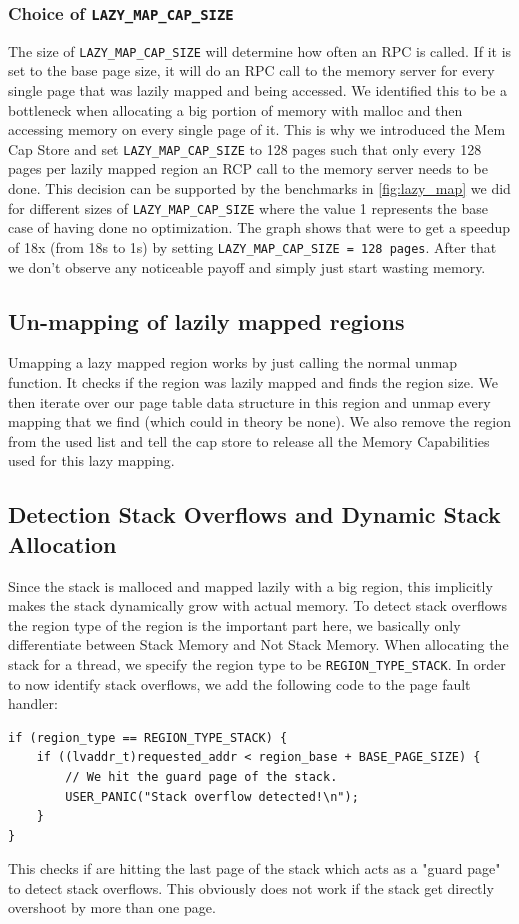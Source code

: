 \subsubsection{Choice of \texttt{LAZY_MAP_CAP_SIZE} } 
The size of  \texttt{LAZY_MAP_CAP_SIZE} will determine how often an RPC is called. 
If it is set to the base page size, it will do an RPC call to the memory server for every single page that was lazily mapped and being accessed. 
We identified this to be a bottleneck when allocating a big portion of memory with malloc and then accessing memory on every single page of it. 
This is why we introduced the Mem Cap Store and set \texttt{LAZY_MAP_CAP_SIZE} to 128 pages such that only every 128 pages per lazily mapped region an RCP call to the memory server needs to be done. 
This decision can be supported by the benchmarks in \ref{fig:lazy_map} we did for different sizes of \texttt{LAZY_MAP_CAP_SIZE} where the value 1 represents the base case of having done no optimization. 
The graph shows that were to get a speedup of 18x (from 18s to 1s) by setting \texttt{LAZY_MAP_CAP_SIZE = 128 pages}. After that we don't observe any noticeable payoff and simply just start wasting memory.




\subsection{Un-mapping of lazily mapped regions}

Umapping a lazy mapped region works by just calling the normal unmap function. 
It checks if the region was lazily mapped and finds the region size. We then iterate over our page table data structure in this region and unmap every mapping that we find (which could in theory be none). We also remove the region from the used list and tell the cap store to release all the Memory Capabilities used for this lazy mapping.

\subsection{Detection Stack Overflows and Dynamic Stack Allocation}
Since the stack is malloced and mapped lazily with a big region, this implicitly makes the stack dynamically grow with actual memory.
To detect stack overflows the region type of the region is the important part here, we basically only differentiate between Stack Memory and Not Stack Memory. When allocating the stack for a thread, we specify the region type to be \texttt{REGION_TYPE_STACK}.
In order to now identify stack overflows, we add the following code to the page fault handler:
\begin{verbatim}
if (region_type == REGION_TYPE_STACK) {
    if ((lvaddr_t)requested_addr < region_base + BASE_PAGE_SIZE) {
        // We hit the guard page of the stack.
        USER_PANIC("Stack overflow detected!\n");
    }
}
\end{verbatim}
This checks if are hitting the last page of the stack which acts as a "guard page" to detect stack overflows. This obviously does not work if the stack get directly overshoot by more than one page.


